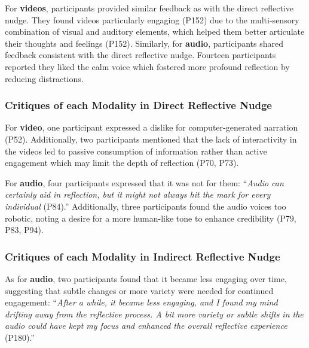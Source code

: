 For \textbf{videos}, participants provided similar feedback as with the direct reflective nudge. They found videos particularly engaging (P152) due to the multi-sensory combination of visual and auditory elements, which helped them better articulate their thoughts and feelings (P152). 
Similarly, for \textbf{audio}, participants shared feedback consistent with the direct reflective nudge. Fourteen participants reported they liked the calm voice which fostered more profound reflection by reducing distractions.

\subsubsection{Critiques of each Modality in Direct Reflective Nudge}
For \textbf{video}, one participant expressed a dislike for computer-generated narration (P52). Additionally, two participants mentioned that the lack of interactivity in the videos led to passive consumption of information rather than active engagement which may limit the depth of reflection (P70, P73).

For \textbf{audio}, four participants expressed that it was not for them: ``\textit{Audio can certainly aid in reflection, but it might not always hit the mark for every individual} (P84).'' %
Additionally, three participants found the audio voices too robotic, noting a desire for a more human-like tone to enhance credibility (P79, P83, P94).

\subsubsection{Critiques of each Modality in Indirect Reflective Nudge}

As for \textbf{audio}, two participants found that it became less engaging over time, suggesting that subtle changes or more variety were needed for continued engagement: ``\textit{After a while, it became less engaging, and I found my mind drifting away from the reflective process. A bit more variety or subtle shifts in the audio could have kept my focus and enhanced the overall reflective experience} (P180).''